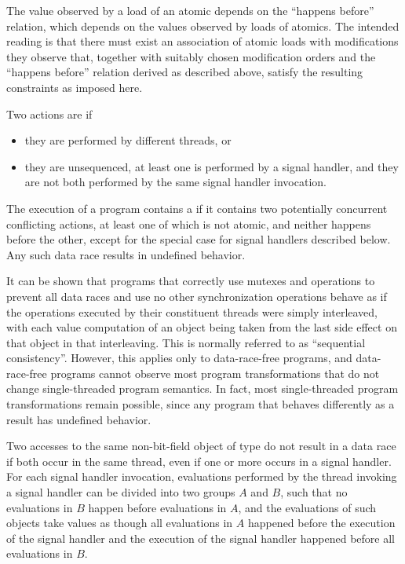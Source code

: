\pnum
\begin{note}
The value observed by a load of an atomic depends on the ``happens
before'' relation, which depends on the values observed by loads of atomics.
The intended reading is that there must exist an
association of atomic loads with modifications they observe that, together with
suitably chosen modification orders and the ``happens before'' relation derived
as described above, satisfy the resulting constraints as imposed here.
\end{note}

\pnum
Two actions are  if
\begin{itemize}
\item they are performed by different threads, or
\item they are unsequenced, at least one is performed by a signal handler, and
they are not both performed by the same signal handler invocation.
\end{itemize}
The execution of a program contains a  if it contains two
potentially concurrent conflicting actions, at least one of which is not atomic,
and neither happens before the other,
except for the special case for signal handlers described below.
Any such data race results in undefined
behavior.
\begin{note}
It can be shown that programs that correctly use mutexes
and  operations to prevent all data races and use no
other synchronization operations behave as if the operations executed by their
constituent threads were simply interleaved, with each
%
value computation of an
object being taken from the last
%
side effect on that object in that
interleaving. This is normally referred to as ``sequential consistency''.
However, this applies only to data-race-free programs, and data-race-free
programs cannot observe most program transformations that do not change
single-threaded program semantics. In fact, most single-threaded program
transformations remain possible, since any program that behaves
differently as a result has undefined behavior.
\end{note}

\pnum
Two accesses to the same non-bit-field object
of type  do not
result in a data race if both occur in the same thread, even if one or more
occurs in a signal handler. For each signal handler invocation, evaluations
performed by the thread invoking a signal handler can be divided into two
groups $A$ and $B$, such that no evaluations in
$B$ happen before evaluations in $A$, and the
evaluations of such  objects take values as though
all evaluations in $A$ happened before the execution of the signal
handler and the execution of the signal handler happened before all evaluations
in $B$.

